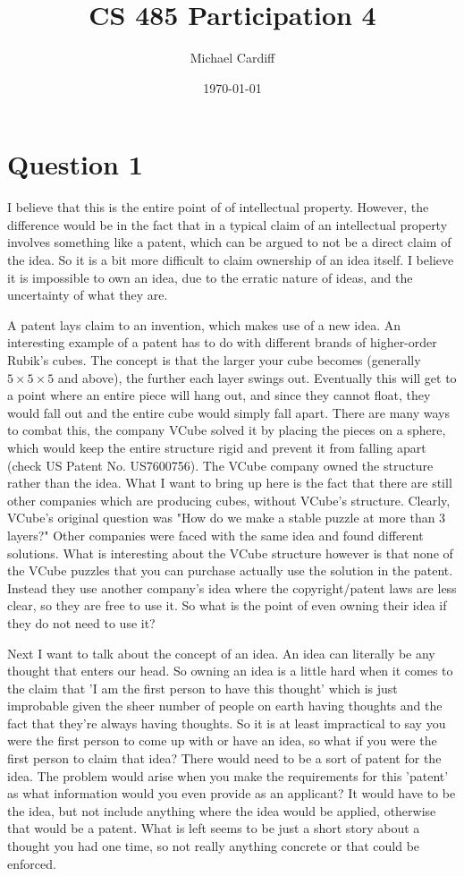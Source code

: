 \documentclass[12pt]{article}
\title{CS 485 Participation 4}
\author{Michael Cardiff}
\date{\today}
\begin{document}
\maketitle

\section*{Question 1}
I believe that this is the entire point of of intellectual property. However, the difference would be in the fact that in a typical claim of an intellectual property involves something like a patent, which can be argued to not be a direct claim of the idea. So it is a bit more difficult to claim ownership of an idea itself. I believe it is impossible to own an idea, due to the erratic nature of ideas, and the uncertainty of what they are.

A patent lays claim to an invention, which makes use of a new idea. An interesting example of a patent has to do with different brands of higher-order Rubik's cubes. The concept is that the larger your cube becomes (generally $5\times 5\times 5$ and above), the further each layer swings out. Eventually this will get to a point where an entire piece will hang out, and since they cannot float, they would fall out and the entire cube would simply fall apart. There are many ways to combat this, the company VCube solved it by placing the pieces on a sphere, which would keep the entire structure rigid and prevent it from falling apart (check US Patent No. US7600756). The VCube company owned the structure rather than the idea. What I want to bring up here is the fact that there are still other companies which are producing cubes, without VCube's structure. Clearly, VCube's original question was "How do we make a stable puzzle at more than 3 layers?" Other companies were faced with the same idea and found different solutions. What is interesting about the VCube structure however is that none of the VCube puzzles that you can purchase actually use the solution in the patent. Instead they use another company's idea where the copyright/patent laws are less clear, so they are free to use it. So what is the point of even owning their idea if they do not need to use it?

Next I want to talk about the concept of an idea. An idea can literally be any thought that enters our head. So owning an idea is a little hard when it comes to the claim that 'I am the first person to have this thought' which is just improbable given the sheer number of people on earth having thoughts and the fact that they're always having thoughts. So it is at least impractical to say you were the first person to come up with or have an idea, so what if you were the first person to claim that idea? There would need to be a sort of patent for the idea. The problem would arise when you make the requirements for this 'patent' as what information would you even provide as an applicant? It would have to be the idea, but not include anything where the idea would be applied, otherwise that would be a patent. What is left seems to be just a short story about a thought you had one time, so not really anything concrete or that could be enforced. 
\end{document}
